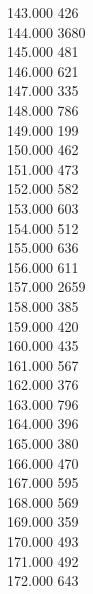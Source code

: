 { 143.000	426 \\
 144.000	3680 \\
 145.000	481 \\
 146.000	621 \\
 147.000	335 \\
 148.000	786 \\
 149.000	199 \\
 150.000	462 \\
 151.000	473 \\
 152.000	582 \\
 153.000	603 \\
 154.000	512 \\
 155.000	636 \\
 156.000	611 \\
 157.000	2659 \\
 158.000	385 \\
 159.000	420 \\
 160.000	435 \\
 161.000	567 \\
 162.000	376 \\
 163.000	796 \\
 164.000	396 \\
 165.000	380 \\
 166.000	470 \\
 167.000	595 \\
 168.000	569 \\
 169.000	359 \\
 170.000	493 \\
 171.000	492 \\
 172.000	643 \\
}
